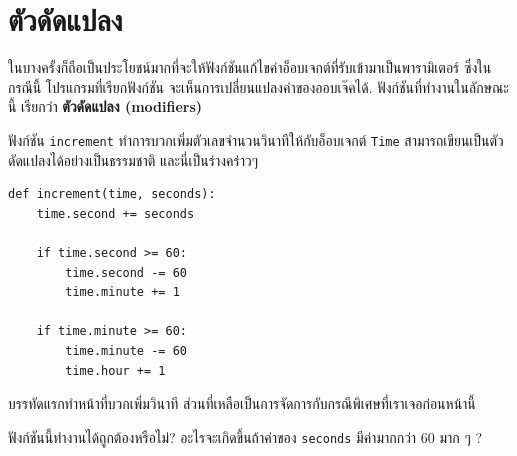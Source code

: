 \section{ตัวดัดแปลง} %
\label{increment}


ในบางครั้งก็ถือเป็นประโยชน์มากที่จะให้ฟังก์ชันแก้ไขค่าอ็อบเจกต์ที่รับเข้ามาเป็นพารามิเตอร์ 
ซึ่งในกรณีนี้
โปรแกรมที่เรียกฟังก์ชัน จะเห็นการเปลี่ยนแปลงค่าของออบเจ๊คได้.
ฟังก์ชันที่ทำงานในลักษณะนี้
เรียกว่า {\bf ตัวดัดแปลง (modifiers)}


ฟังก์ชัน {\tt increment} ทำการบวกเพิ่มตัวเลขจำนวนวินาทีให้กับอ็อบเจกต์ {\tt Time} สามารถเขียนเป็นตัวดัดแปลงได้อย่างเป็นธรรมชาติ และนี่เป็นร่างคร่าวๆ

\begin{verbatim}
def increment(time, seconds):
    time.second += seconds

    if time.second >= 60:
        time.second -= 60
        time.minute += 1

    if time.minute >= 60:
        time.minute -= 60
        time.hour += 1
\end{verbatim}
%

บรรทัดแรกทำหน้าที่บวกเพิ่มวินาที ส่วนที่เหลือเป็นการจัดการกับกรณีพิเศษที่เราเจอก่อนหน้านี้

ฟังก์ชันนี้ทำงานได้ถูกต้องหรือไม่? อะไรจะเกิดขึ้นถ้าค่าของ {\tt seconds} มีค่ามากกว่า 60 มาก ๆ ?



